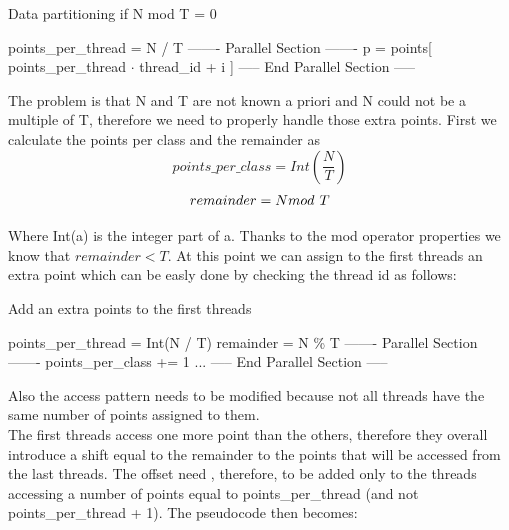 \documentclass{report}
\begin{document}
\begin{minipage}[b]{0.48\textwidth}
  \begin{algorithm}[H]
    \caption{Data partitioning if N mod T = 0}
    \begin{algorithmic}
      \State points\_per\_thread = N / T
      \State ------- Parallel Section -------
        \State p = points[ points\_per\_thread $\cdot$ thread\_id + i ]
      \EndFor
      \State ----- End Parallel Section -----
    \end{algorithmic}
  \end{algorithm}

  The problem is that N and T are not known a priori and N could not be a multiple of T, therefore we need to properly handle those extra points. First we calculate the points per class and the remainder as
  \begin{equation}
    points\_per\_class = Int(\frac{N}{T})
  \end{equation}
  \begin{equation}
    remainder = N mod\hspace{0.05in} T
  \end{equation}

  Where Int(a) is the integer part of a.
  Thanks to the mod operator properties we know that $remainder < T$. At this point we can assign to the first threads an extra point which can be easly done by checking the thread id as follows:

  \begin{algorithm}[H]
    \caption{Add an extra points to the first threads}
    \begin{algorithmic}
      \State points\_per\_thread = Int(N / T)
      \State remainder = N \% T
      \State ------- Parallel Section -------
        \State points\_per\_class += 1
      \EndIf
      \State ...
      \State ----- End Parallel Section -----
    \end{algorithmic}
  \end{algorithm}

  Also the access pattern needs to be modified because not all threads have the same number of points assigned to them. \\

  The first threads access one more point than the others, therefore they overall introduce a shift equal to the remainder to the points that will be accessed from the last threads. The offset need , therefore, to be added only to the threads accessing a number of points equal to points\_per\_thread (and not points\_per\_thread + 1). The pseudocode then becomes:


\end{minipage}
\end{document}
